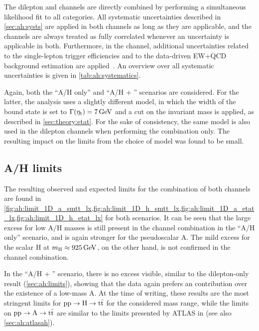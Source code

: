The dilepton and \ljets channels are directly combined by performing a simultaneous likelihood fit to all categories. All systematic uncertainties described in \cref{sec:ah:systs} are applied in both channels as long as they are applicable, and the channels are always treated as fully correlated whenever an uncertainty is applicable in both. Furthermore, in the \ljets channel, additional uncertainties related to the single-lepton trigger efficiencies and to the data-driven EW+QCD background estimation are applied~\cite{CMS:HIG-22-013}. An overview over all systematic uncertainties is given in \cref{tab:ah:systematics}.

Again, both the ``A/H only'' and ``A/H + \etat'' scenarios are considered. For the latter, the \ljets analysis uses a slightly different \etat model, in which the width of the bound state is set to $\Gammaetat = \SI{7}{\GeV}$ and a cut on the invariant mass \mWWbb is applied, as described in \cref{sec:theory:etat}. For the sake of consistency, the same model is also used in the dilepton channels when performing the combination only. The resulting impact on the limits from the choice of \etat model was found to be small. 

\subsection{A/H limits}
\label{sec:ah:combinedlimits}

The resulting observed and expected limits for the combination of both channels are found in \cref{fig:ah:limit_1D_a_smtt_lx,fig:ah:limit_1D_h_smtt_lx,fig:ah:limit_1D_a_etat_lx,fig:ah:limit_1D_h_etat_lx} for both scenarios. It can be seen that the large excess for low A/H masses is still present in the channel combination in the ``A/H only'' scenario, and is again stronger for the pseudoscalar A. The mild excess for the scalar H at $\mH \approx \SI{925}{\GeV}$, on the other hand, is not confirmed in the channel combination.

In the ``A/H + \etat'' scenario, there is no excess visible, similar to the dilepton-only result (\cref{sec:ah:limits}), showing that the data again prefers an \etat contribution over the existence of a low-mass A. At the time of writing, these results are the most stringent limits for $\mathrm{pp \rightarrow H \rightarrow \mathrm{t \bar{t}}}$ for the considered mass range, while the limits on $\mathrm{pp \rightarrow A \rightarrow \mathrm{t \bar{t}}}$ are similar to the limits presented by ATLAS in  (see also \cref{sec:ah:atlasah}).

